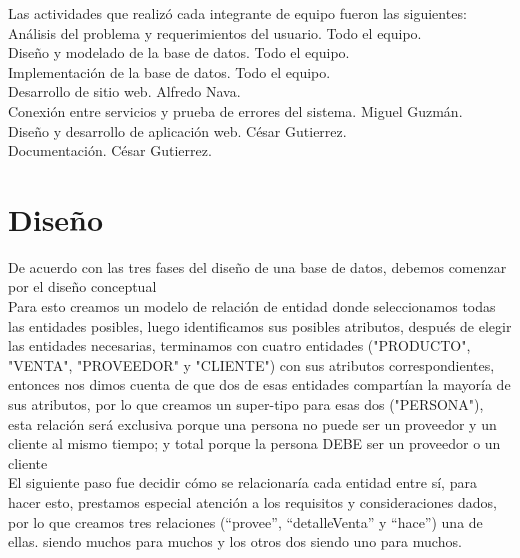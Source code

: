 \documentclass{article}
\begin{document}
Las actividades que realizó cada integrante de equipo fueron las siguientes:\\

Análisis del problema y requerimientos del usuario.\- Todo el equipo.\\

Diseño y modelado de la base de datos. \- Todo el equipo.\\

Implementación de la base de datos. \- Todo el equipo.\\

Desarrollo de sitio web. \- Alfredo Nava.\\

Conexión entre servicios y prueba de errores del sistema. \- Miguel Guzmán.\\

Diseño y desarrollo de aplicación web. \- César Gutierrez.\\

Documentación. \- César Gutierrez.\\

\section{Diseño}

De acuerdo con las tres fases del diseño de una base de datos, debemos comenzar por el diseño conceptual\\

Para esto creamos un modelo de relación de entidad donde seleccionamos todas las entidades posibles, luego identificamos sus posibles atributos, después de elegir las entidades necesarias, terminamos con cuatro entidades ("PRODUCTO", "VENTA", "PROVEEDOR" y "CLIENTE") con sus atributos correspondientes, entonces nos dimos cuenta de que dos de esas entidades compartían la mayoría de sus atributos, por lo que creamos un super-tipo para esas dos ("PERSONA"), esta relación será exclusiva porque una persona no puede ser un proveedor y un cliente al mismo tiempo; y total porque la persona DEBE ser un proveedor o un cliente\\

El siguiente paso fue decidir cómo se relacionaría cada entidad entre sí, para hacer esto, prestamos especial atención a los requisitos y consideraciones dados, por lo que creamos tres relaciones (“provee”, “detalle\textunderscore Venta” y “hace”) una de ellas. siendo muchos para muchos y los otros dos siendo uno para muchos.\\
\end{document}
